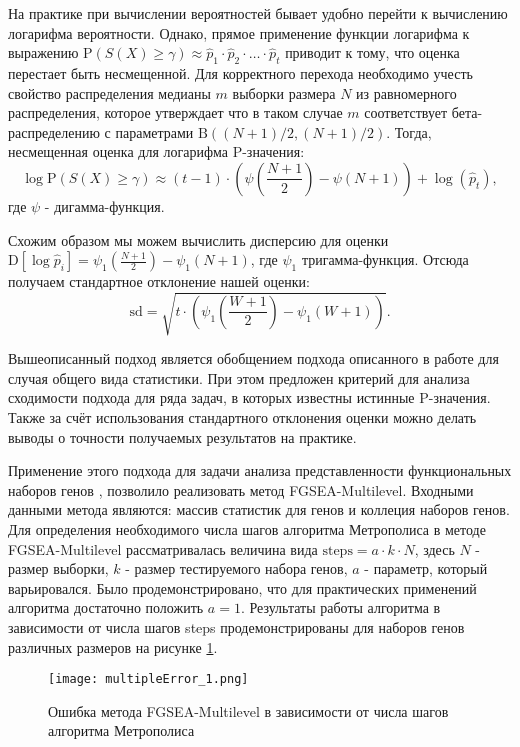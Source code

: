 На практике при вычислении вероятностей бывает удобно перейти к вычислению логарифма вероятности.
Однако, прямое применение функции логарифма к выражению $\mathrm{P} \left(S(X) \geqslant \gamma \right) \approx \hat{p}_1 \cdot \hat{p}_2 \cdot \ldots \cdot \hat{p}_t $ приводит к тому, что оценка перестает быть несмещенной.
Для корректного перехода необходимо учесть свойство распределения медианы $m$ выборки размера $N$ из равномерного распределения, которое утверждает что в таком случае $m$ соответствует бета-распределению с параметрами $\mathrm{B} \left((N + 1) / 2, (N + 1)/ 2 \right)$. Тогда, несмещенная оценка для логарифма P-значения:
\[
    \log \mathrm{P} \left(S(X) \geqslant \gamma \right) \approx (t - 1) \cdot \left( \psi \left( \frac{N + 1}{2}\right) - \psi \left(N + 1 \right)\right) + \log (\hat{p}_t),
\]
где $\psi$ - дигамма-функция.

Схожим образом мы можем вычислить дисперсию для оценки $\mathrm{D} \left[\log \hat{p}_i \right]= \psi_1 \left(\frac{N + 1}{2}\right) - \psi_1 \left( N + 1 \right)$, где $\psi_1$ тригамма-функция. Отсюда получаем стандартное отклонение нашей оценки:
\[
    \mathrm{sd} = \sqrt{t \cdot \left( \psi_1 \left(\frac{W+1}{2}\right) - \psi_1 \left(W + 1\right)\right)}.    
\]

Вышеописанный подход является обобщением подхода описанного в работе \cite{KorotkevichVKR} для случая общего вида статистики.
При этом предложен критерий для анализа сходимости подхода для ряда задач, в которых известны истинные P-значения.
Также за счёт использования стандартного отклонения оценки можно делать выводы о точности получаемых результатов на практике.

Применение этого подхода для задачи анализа представленности функциональных наборов генов \cite{KorotkevichVKR}, позволило реализовать метод FGSEA-Multilevel.
Входными данными метода являются: массив статистик для генов и коллеция наборов генов.
Для определения необходимого числа шагов алгоритма Метрополиса в методе FGSEA-Multilevel рассматривалась величина вида $\text{steps} = a \cdot k \cdot N$, здесь $N$ - размер выборки, $k$ - размер тестируемого набора генов, $a$ - параметр, который варьировался.
Было продемонстрировано, что для практических применений алгоритма достаточно положить $a = 1$.
Результаты работы алгоритма в зависимости от числа шагов steps продемонстрированы для наборов генов различных размеров на рисунке \ref{fig:pval_error}.

\begin{figure}[h]
    \texttt{[image: multipleError\_1.png]}
    \centering
    \caption{Ошибка метода FGSEA-Multilevel в зависимости от числа шагов алгоритма Метрополиса}
    \label{fig:pval_error}
\end{figure}

